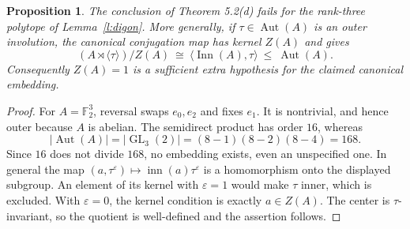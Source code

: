 \documentclass[11pt,a4paper]{article}
\newtheorem{proposition}{Proposition}
\newcommand{\Aut}{\operatorname{Aut}}
\newcommand{\Inn}{\operatorname{Inn}}
\newcommand{\F}{\mathbb F}
\begin{document}
\begin{proposition}\label{p:embedding}
The conclusion of Theorem 5.2(d) fails for the rank-three polytope of
Lemma~\ref{l:digon}. More generally, if $\tau\in\Aut(A)$ is an outer
involution, the canonical conjugation map has kernel $Z(A)$ and gives
\[
 (A\rtimes\langle\tau\rangle)/Z(A)
       \ \cong\ \langle\Inn(A),\tau\rangle\ \leq\ \Aut(A).
\]
Consequently $Z(A)=1$ is a sufficient extra hypothesis for the claimed
canonical embedding.
\end{proposition}
\begin{proof}
For $A=\F_2^3$, reversal swaps $e_0,e_2$ and fixes $e_1$. It is nontrivial,
and hence outer because $A$ is abelian. The semidirect product has order
$16$, whereas
\[
 |\Aut(A)|=|\operatorname{GL}_3(2)|=(8-1)(8-2)(8-4)=168.
\]
Since $16$ does not divide $168$, no embedding exists, even an unspecified
one. In general the map $(a,\tau^\varepsilon)\mapsto
\operatorname{inn}(a)\tau^\varepsilon$ is a homomorphism onto the displayed
subgroup. An element of its kernel with $\varepsilon=1$ would make $\tau$
inner, which is excluded. With $\varepsilon=0$, the kernel condition is
exactly $a\in Z(A)$. The center is $\tau$-invariant, so the quotient is
well-defined and the assertion follows.
\end{proof}
\end{document}
